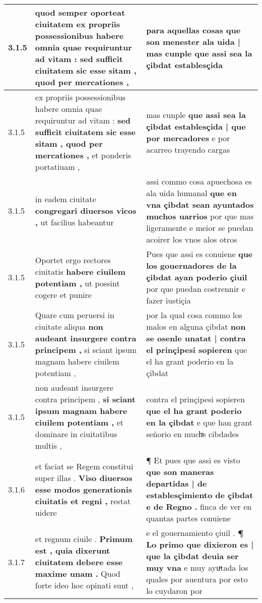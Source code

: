 \begin{tabular}{|p{1cm}|p{6.5cm}|p{6.5cm}|}
3.1.5 & quod semper oporteat ciuitatem \textbf{ ex propriis possessionibus habere omnia quae requiruntur ad vitam : } sed sufficit ciuitatem sic esse sitam , quod per mercationes , & para aquellas cosas \textbf{ que son menester ala uida | mas cunple } que assi sea la çibdat establesçida \\\hline
3.1.5 & ex propriis possessionibus habere omnia quae requiruntur ad vitam : \textbf{ sed sufficit ciuitatem sic esse sitam , quod per mercationes , } et ponderis portatiuam , & mas cunple \textbf{ que assi sea la çibdat establesçida | que por mercadores } e por acarreo trayendo cargas \\\hline
3.1.5 & in eadem ciuitate \textbf{ congregari diuersos vicos , } ut facilius habeantur & assi commo cosa apuechosa es ala uida humanal \textbf{ que en vna çibdat sean ayuntados muchos uarrios } por que mas ligeramente e meior se puedan acoirer los vnos alos otros \\\hline
3.1.5 & Oportet ergo rectores ciuitatis \textbf{ habere ciuilem potentiam , } ut possint cogere et punire & Pues que assi es conuiene \textbf{ que los gouernadores de la çibdat ayan poderio çiuil } por que puedan costrennir e fazer iustiçia \\\hline
3.1.5 & Quare cum peruersi in ciuitate aliqua \textbf{ non audeant insurgere contra principem , } si sciant ipsum magnam habere ciuilem potentiam , & por la qual cosa commo los malos en alguna çibdat \textbf{ non se osenle unatat | contra el prinçipesi sopieren } que el ha grant poderio en la çibdat \\\hline
3.1.5 & non audeant insurgere contra principem , \textbf{ si sciant ipsum magnam habere ciuilem potentiam , } et dominare in ciuitatibus multis , & contra el prinçipesi sopieren \textbf{ que el ha grant poderio en la çibdat } e que han grant señorio en muchͣs cibdades \\\hline
3.1.6 & et faciat se Regem constitui super illas . \textbf{ Viso diuersos esse modos generationis ciuitatis et regni , } restat uidere & ¶ Et pues que assi es visto \textbf{ que son maneras departidas | de establesçimiento de çibdat e de Regno . } finca de ver en quantas partes conuiene \\\hline
3.1.7 & et regnum ciuile . \textbf{ Primum est , quia dixerunt ciuitatem debere esse maxime unam . } Quod forte ideo hoc opinati sunt , & e el gouernamiento çiuil . \textbf{ ¶ Lo primo que dixieron es | que la çibdat deuia ser muy vna } e muy ayuͣtada los quales por auentura por esto lo cuydaron por \\\hline

\end{tabular}
